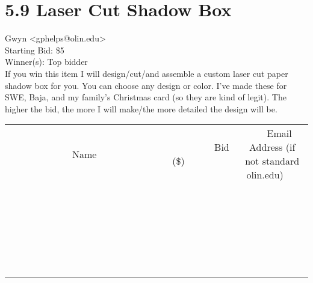 \documentclass[11pt]{article}
\begin{document}
					\section*{5.9 Laser Cut Shadow Box}
					Gwyn <gphelps@olin.edu> \\
					Starting Bid: \$5 \\
					Winner(s): Top bidder \\
					If you win this item I will design/cut/and assemble a custom laser cut paper shadow box for you. You can choose any design or color. I've made these for SWE, Baja, and my family's Christmas card (so they are kind of legit). The higher the bid, the more I will make/the more detailed the design will be. \\
					[6ex]
					\begin{tabular}{c c c}
						~~~~~~~~~~~~~Name~~~~~~~~~~~~~ & ~~~~~~~~~Bid (\$)~~~~~~~~~ & ~~~Email Address (if not standard olin.edu)~~~ \\
				
 & & \\
\hline
 & & \\
\hline
 & & \\
\hline
 & & \\
\hline
 & & \\
\hline
 & & \\
\hline
 & & \\
\hline
 & & \\
\hline
 & & \\
\hline
 & & \\
\hline
 & & \\
\hline
 & & \\
\hline
 & & \\
\hline
 & & \\
\hline
 & & \\
\hline
 & & \\
\hline
 & & \\
\hline
 & & \\
\hline
 & & \\
\hline
 & & \\
\hline
 & & \\
\hline
 & & \\
\hline
 & & \\
\hline
 & & \\
\hline
 & & \\
\hline
 & & \\
\hline
					\end{tabular}
					\clearpage
				
\end{document}
